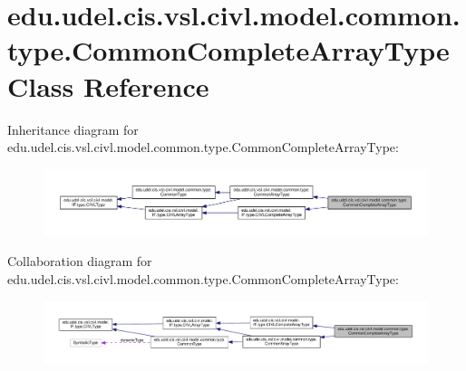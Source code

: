 \hypertarget{classedu_1_1udel_1_1cis_1_1vsl_1_1civl_1_1model_1_1common_1_1type_1_1CommonCompleteArrayType}{}\section{edu.\+udel.\+cis.\+vsl.\+civl.\+model.\+common.\+type.\+Common\+Complete\+Array\+Type Class Reference}
\label{classedu_1_1udel_1_1cis_1_1vsl_1_1civl_1_1model_1_1common_1_1type_1_1CommonCompleteArrayType}


Inheritance diagram for edu.\+udel.\+cis.\+vsl.\+civl.\+model.\+common.\+type.\+Common\+Complete\+Array\+Type\+:
\nopagebreak
\begin{figure}[H]
\begin{center}
\leavevmode
\includegraphics[width=350pt]{classedu_1_1udel_1_1cis_1_1vsl_1_1civl_1_1model_1_1common_1_1type_1_1CommonCompleteArrayType__inherit__graph}
\end{center}
\end{figure}


Collaboration diagram for edu.\+udel.\+cis.\+vsl.\+civl.\+model.\+common.\+type.\+Common\+Complete\+Array\+Type\+:
\nopagebreak
\begin{figure}[H]
\begin{center}
\leavevmode
\includegraphics[width=350pt]{classedu_1_1udel_1_1cis_1_1vsl_1_1civl_1_1model_1_1common_1_1type_1_1CommonCompleteArrayType__coll__graph}
\end{center}
\end{figure}
